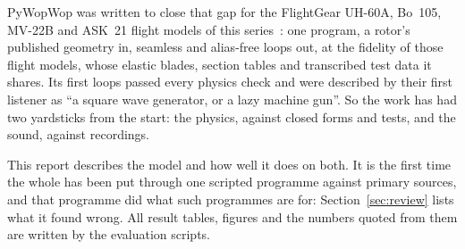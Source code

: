 \documentclass[10pt,a4paper,twocolumn]{article}
\begin{document}
PyWopWop was written to close that gap for the FlightGear UH-60A, Bo~105, MV-22B and ASK~21 flight models of this series~\cite{uh60rep,bo105rep,v22rep,ask21rep}: one program, a
rotor's published geometry in, seamless and alias-free loops out, at the fidelity of those flight models, whose elastic blades, section tables and transcribed
test data it shares. Its first loops passed every physics check and were described by their first listener as ``a square wave generator, or a lazy machine gun''.
So the work has had two yardsticks from the start: the physics, against closed forms and tests, and the sound, against recordings.

This report describes the model and how well it does on both. It is the first time the whole has been put through one scripted programme against primary sources, and that programme did what such programmes are for: Section~\ref{sec:review} lists what it found wrong. All result tables, figures and the numbers quoted from them are written by the evaluation scripts.

\end{document}
